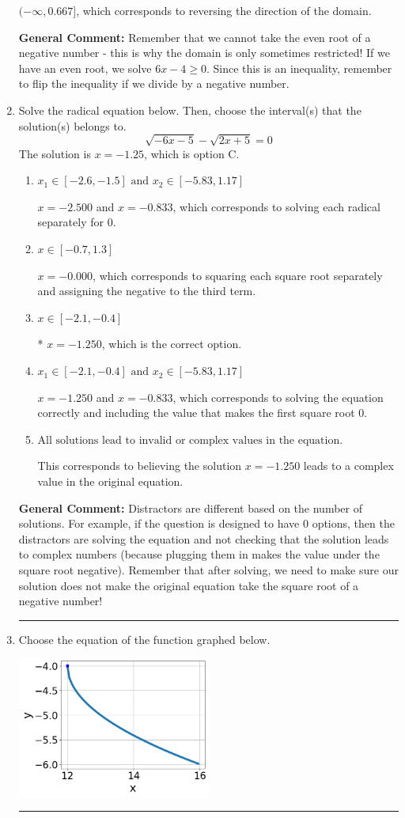 \documentclass{extbook}[14pt]
\newcommand{\litem}[1]{\item #1

\rule{\textwidth}{0.4pt}}
\begin{document}
\begin{enumerate}
{\begin{enumerate}[label=\Alph*.]
 $(-\infty, 0.667]$, which corresponds to reversing the direction of the domain.
\end{enumerate}

\textbf{General Comment:} Remember that we cannot take the even root of a negative number - this is why the domain is only sometimes restricted! If we have an even root, we solve $6 x - 4 \geq 0$. Since this is an inequality, remember to flip the inequality if we divide by a negative number.
}
\litem{
Solve the radical equation below. Then, choose the interval(s) that the solution(s) belongs to.
\[ \sqrt{-6 x - 5} - \sqrt{2 x + 5} = 0 \]The solution is \( x = -1.25 \), which is option C.\begin{enumerate}[label=\Alph*.]
\item \( x_1 \in [-2.6, -1.5] \text{ and } x_2 \in [-5.83,1.17] \)

$x = -2.500$ and $x = -0.833$, which corresponds to solving each radical separately for 0.
\item \( x \in [-0.7,1.3] \)

$x = -0.000$, which corresponds to squaring each square root separately and assigning the negative to the third term.
\item \( x \in [-2.1,-0.4] \)

* $x = -1.250$, which is the correct option.
\item \( x_1 \in [-2.1, -0.4] \text{ and } x_2 \in [-5.83,1.17] \)

$x = -1.250$ and $x = -0.833$, which corresponds to solving the equation correctly and including the value that makes the first square root 0.
\item \( \text{All solutions lead to invalid or complex values in the equation.} \)

This corresponds to believing the solution $x = -1.250$ leads to a complex value in the original equation.
\end{enumerate}

\textbf{General Comment:} Distractors are different based on the number of solutions. For example, if the question is designed to have 0 options, then the distractors are solving the equation and not checking that the solution leads to complex numbers (because plugging them in makes the value under the square root negative). Remember that after solving, we need to make sure our solution does not make the original equation take the square root of a negative number!
}
\litem{
Choose the equation of the function graphed below.

\begin{center}
    \includegraphics[width=0.5\textwidth]{../Figures/radicalGraphToEquationC.png}
\end{center}


}
\end{enumerate}
\end{document}
